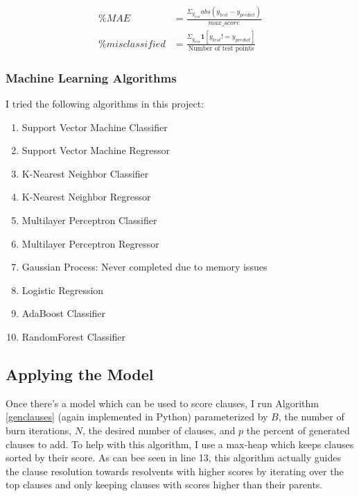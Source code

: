 \documentclass[letterpaper]{article} %
\begin{document}
\begin{equation*}
\begin{split}
\% MAE &= \frac{\Sigma_{y_{test}} abs(y_{test} - y_{predict})}{max\_score} \\
\% misclassified &= \frac{\Sigma_{y_{test}} \textbf{1}[y_{test} != y_{predict}]}{\text{Number of test points}}
\end{split}
\end{equation*}

\subsubsection{Machine Learning Algorithms}

I tried the following algorithms in this project:

\begin{enumerate}
\item Support Vector Machine Classifier
\item Support Vector Machine Regressor
\item K-Nearest Neighbor Classifier
\item K-Nearest Neighbor Regressor
\item Multilayer Perceptron Classifier
\item Multilayer Perceptron Regressor
\item Gaussian Process: Never completed due to memory issues
\item Logistic Regression
\item AdaBoost Classifier
\item RandomForest Classifier
\end{enumerate}

\subsection{Applying the Model}

Once there's a model which can be used to score clauses, I run Algorithm \ref{genclauses} (again implemented in Python) parameterized by $B$, the number of burn iterations, $N$, the desired number of clauses, and $p$ the percent of generated clauses to add. To help with this algorithm, I use a max-heap which keeps clauses sorted by their score. As can bee seen in line 13, this algorithm actually guides the clause resolution towards resolvents with higher scores by iterating over the top clauses and only keeping clauses with scores higher than their parents.
\end{document}
